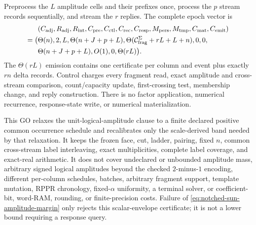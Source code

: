 \begin{theorem}
Preprocess the $L$ amplitude cells and their prefixes once, process the $p$
stream records sequentially, and stream the $r$ replies.  The complete epoch
vector is
\begin{equation}
 \begin{aligned}
 &(C_{\rm adj},R_{\rm adj},R_{\rm int},C_{\rm pre},C_{\rm ctl},C_{\rm rec},
 C_{\rm resp},M_{\rm pers},M_{\rm tmp},C_{\rm mat},C_{\rm emit})\\
 =\bigl(&\Theta(n),2,L,\Theta(n+J+p+L),
 \Theta(\mathcal C_{\rm frag}^{\Sigma}+rL+L+n),0,0,\\
 &\Theta(n+J+p+L),O(1),0,\Theta(rL)\bigr).
 \end{aligned}
 \label{eq:notched-sun-amplitude-eleven-vector}
\end{equation}
The $\Theta(rL)$ emission contains one certificate per column and event plus
exactly $rn$ delta records.  Control charges every fragment read, exact
amplitude and cross-stream comparison, count/capacity update, first-crossing
test, membership change, and reply construction.  There is no factor
application, numerical recurrence, response-state write, or numerical
materialization.

This GO relaxes the unit-logical-amplitude clause to a finite declared
positive common occurrence schedule and recalibrates only the scale-derived
band needed by that relaxation.  It keeps the frozen face, cut, ladder,
pairing, fixed $n$, common cross-stream label interleaving, exact
multiplicities, complete label coverage, and exact-real arithmetic.  It does
not cover undeclared or unbounded amplitude mass, arbitrary signed logical
amplitudes beyond the checked $2$-minus-$1$ encoding, different per-column
schedules, batches, arbitrary fragment support, template mutation, RPPR
chronology, fixed-$\alpha$ uniformity, a terminal solver, or coefficient-bit,
word-RAM, rounding, or finite-precision costs.  Failure of
\cref{eq:notched-sun-amplitude-margin} only rejects this scalar-envelope
certificate; it is not a lower bound requiring a response query.
\end{theorem}

